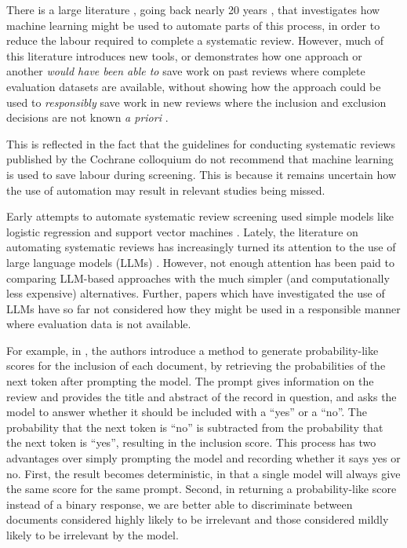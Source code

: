 \documentclass{article}
\begin{document}
	There is a large literature \cite{omara-eves_using_2015}, going back nearly 20 years \cite{cohen_reducing_2006}, that investigates how machine learning might be used to automate parts of this process, in order to reduce the labour required to complete a systematic review. However, much of this literature introduces new tools, or demonstrates how one approach or another \textit{would have been able to} save work on past reviews where complete evaluation datasets are available, without showing how the approach could be used to \textit{responsibly} save work in new reviews where the inclusion and exclusion decisions are not known \textit{a priori}  \cite{van_de_schoot_open_2021, rathbone_faster_2015, yang_goldilocks_2022}.
	
	This is reflected in the fact that the guidelines for conducting systematic reviews published by the Cochrane colloquium \cite{lefebvre_chapter_2023} do not recommend that machine learning is used to save labour during screening. This is because it remains uncertain how the use of automation may result in relevant studies being missed.
	
	Early attempts to automate systematic review screening used simple models like logistic regression and support vector machines \cite{cohen_reducing_2006}. Lately, the literature on automating systematic reviews has increasingly turned its attention to the use of large language models (LLMs) \cite{oami_performance_2024, wang_zero-shot_2024, luo_evaluating_2024, xia_llmscreen_2024}. However, not enough attention has been paid to comparing LLM-based approaches with the much simpler (and computationally less expensive) alternatives. Further, papers which have investigated the use of LLMs have so far not considered how they might be used in a responsible manner where evaluation data is not available.
	
	For example, in \cite{wang_zero-shot_2024}, the authors introduce a method to generate probability-like scores for the inclusion of each document, by retrieving the probabilities of the next token after prompting the model. The prompt gives information on the review and provides the title and abstract of the record in question, and asks the model to answer whether it should be included with a ``yes'' or a ``no''. The probability that the next token is ``no'' is subtracted from the probability that the next token is ``yes'', resulting in the inclusion score. This process has two advantages over simply prompting the model and recording whether it says yes or no. First, the result becomes deterministic, in that a single model will always give the same score for the same prompt. Second, in returning a probability-like score instead of a binary response, we are better able to discriminate between documents considered highly likely to be irrelevant and those considered mildly likely to be irrelevant by the model.
	
\end{document}
